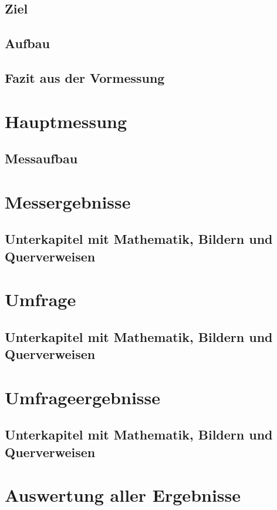 \section{Ziel}

\section{Aufbau}

\section{Fazit aus der Vormessung}

\chapter{Hauptmessung}

\section{Messaufbau}

\chapter{Messergebnisse}

\section{Unterkapitel mit Mathematik, Bildern und Querverweisen}

\chapter{Umfrage}

\section{Unterkapitel mit Mathematik, Bildern und Querverweisen}

\chapter{Umfrageergebnisse}

\section{Unterkapitel mit Mathematik, Bildern und Querverweisen}

\chapter{Auswertung aller Ergebnisse}

